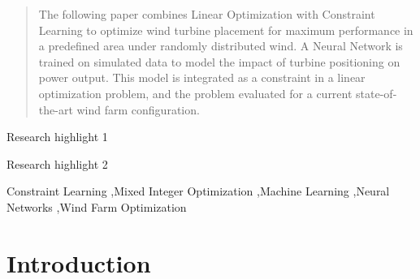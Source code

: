\documentclass[preprint,12pt]{elsarticle}
\begin{document}
\begin{frontmatter}
\begin{abstract}

The following paper combines Linear Optimization with Constraint Learning to optimize wind turbine placement for maximum performance in a predefined area under randomly distributed wind. A Neural Network is trained on simulated data to model the impact of turbine positioning on power output. This model is integrated as a constraint in a linear optimization problem, and the problem evaluated for a current state-of-the-art wind farm configuration.

\end{abstract}

\begin{graphicalabstract}
\end{graphicalabstract}

\begin{highlights}
\item Research highlight 1
\item Research highlight 2
\end{highlights}

\begin{keyword}
Constraint Learning \sep Mixed Integer Optimization \sep Machine Learning \sep Neural Networks \sep Wind Farm Optimization



\end{keyword}

\end{frontmatter}





\section{Introduction}\label{chapter:introduction}
\end{document}
